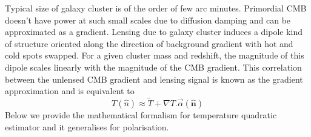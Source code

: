 Typical size of galaxy cluster is of the order of few arc minutes. 
Primordial CMB doesn't have power at such small scales due to diffusion damping \cite{Silk} and can be approximated as a gradient. 
Lensing due to galaxy cluster induces a dipole kind of structure oriented along the direction of background gradient with hot and cold spots swapped.
For a given cluster mass and redshift, the magnitude of this dipole scales linearly with the magnitude of the CMB gradient.
This correlation between the unlensed CMB gradient and lensing signal is known as the gradient approximation and is equivalent to
\begin{equation}
T (\hat{n})\approx \tilde{T}+ \nabla T . \vec{\alpha}(\hat{\textbf{n}})
\end{equation}
Below we provide the mathematical formalism for temperature quadratic estimator and it generalises for polarisation.

